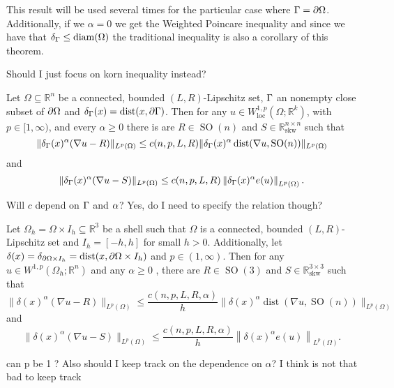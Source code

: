 \begin{remark}
This result will be used several times for the particular case where $\Gamma=\partial\Omega$. Additionally, if we  $\alpha=0$  we get the Weighted Poincare inequality   and since we have that $\delta_\Gamma\leq \operatorname{diam}(\Omega)$ the traditional inequality is also a corollary of this theorem. 
\end{remark}
\begin{question}
Should I just focus on korn inequality instead?
\end{question}
\begin{theorem}
 Let $\Omega \subseteq \mathbb{R}^n$ be a connected, bounded $(L, R)$-Lipschitz set,  $\Gamma$ an nonempty  close subset of $\partial\Omega$ and $\delta_\Gamma(x)=\operatorname{dist}(x, \partial\Gamma)$. Then for any $u \in W_{\mathrm{loc}}^{1, p}\left(\Omega ; \mathbb{R}^k\right)$, with $p \in[1, \infty)$, and every $\alpha\geq0$ there is are $R \in \operatorname{SO}(n)$ and $S \in \mathbb{R}_{\mathrm{skw}}^{n \times n}$ such that
$$
\|\delta_\Gamma(x)^\alpha(\nabla u-R)\|_{L^p(\Omega)} \leq c(n,p, L,R)\|\delta_\Gamma(x)^\alpha\operatorname{dist}(\nabla u, \operatorname{SO}(n))\|_{L^p(\Omega)}
$$
and
$$
\|\delta_\Gamma(x)^\alpha(\nabla u-S)\|_{L^p(\Omega)} \leq  c(n,p, L,R)\left\|\delta_\Gamma(x)^\alpha e(u)\right\|_{L^p(\Omega)}.
$$
\end{theorem}

\begin{question}
Will $c$ depend on $\Gamma$ and $\alpha$? Yes, do I need to specify the relation though?
\end{question}

\begin{theorem}
 Let $\Omega_h=\Omega\times I_h \subseteq \mathbb{R}^3$ be a shell such that $\Omega$ is  a connected, bounded $(L, R)$-Lipschitz set and $I_h=[-h,h]$ for small $h>0$. Additionally, let $\delta(x)=\delta_{\partial\Omega\times I_h}=\operatorname{dist}(x,\partial\Omega\times I_h)$ and $p \in(1, \infty)$. Then for any $u \in W^{1, p}\left(\Omega_h ; \mathbb{R}^n\right)$ and any $\alpha\geq 0 $ , there are $R \in \operatorname{SO}(3)$ and $S \in \mathbb{R}_{\mathrm{skw}}^{3 \times 3}$ such that
$$
\|\delta(x)^\alpha(\nabla u-R)\|_{L^p(\Omega)} \leq \frac{c(n,p,L,R,\alpha)}{h}\|\delta(x)^\alpha\operatorname{dist}(\nabla u, \operatorname{SO}(n))\|_{L^p(\Omega)}
$$
and
$$
\|\delta(x)^\alpha(\nabla u-S)\|_{L^p(\Omega)} \leq  \frac{c(n,p,L,R,\alpha)}{h}\left\|\delta(x)^\alpha e(u)\right\|_{L^p(\Omega)}.
$$
\end{theorem}
\begin{question}
    can p be 1 ? Also should I keep track on the dependence on $\alpha$? I think is not that bad to keep track
\end{question}
